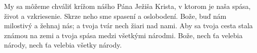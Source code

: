 My sa môžeme chváliť krížom nášho Pána Ježiša Krista, v ktorom je naša spása, život a vzkriesenie.
Skrze neho sme spasení a oslobodení.
\versseparator
Bože, buď nám milostivý a žehnaj nás;
a tvoja tvár nech žiari nad nami.
\versseparator
Aby sa tvoja cesta stala známou na zemi
a tvoja spása medzi všetkými národmi.
\versseparator
Bože, nech ťa velebia národy,
nech ťa velebia všetky národy.